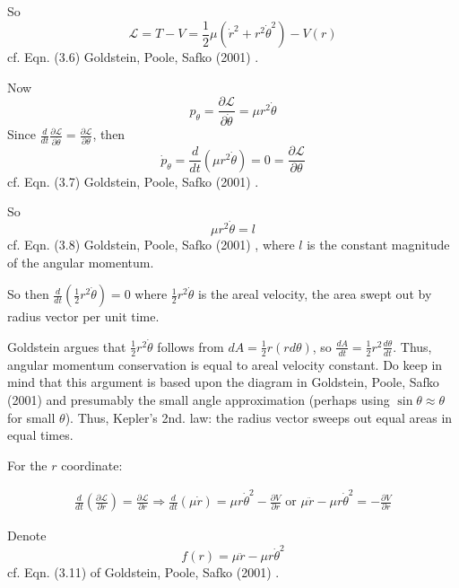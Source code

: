 \documentclass[10pt]{amsart}
\begin{document}
\begin{multicols*}{2}
So 
\begin{equation}
\mathcal{L} = T- V = \frac{1}{2} \mu (\dot{r}^2 + r^2 \dot{\theta}^2 ) - V(r)
\end{equation}
cf. Eqn. (3.6) Goldstein, Poole, Safko (2001) \cite{GPS2001}.

Now
\[
p_{\theta} = \frac{ \partial \mathcal{L} }{ \partial \dot{\theta}} = \mu r^2 \dot{\theta}
\]
Since $\frac{d}{dt} \frac{\partial \mathcal{L}}{ \partial \dot{\theta} } = \frac{\partial \mathcal{L}}{\partial \theta}$, then
\begin{equation}
\dot{p}_{\theta} = \frac{d}{dt} ( \mu r^2 \dot{\theta} ) = 0 = \frac{\partial \mathcal{L}}{\partial \theta}
\end{equation}
cf. Eqn. (3.7)  Goldstein, Poole, Safko (2001) \cite{GPS2001}.

So 
\begin{equation}
\mu r^2 \dot{\theta} = l
\end{equation}
cf. Eqn. (3.8)  Goldstein, Poole, Safko (2001) \cite{GPS2001}, where $l$ is the constant magnitude of the angular momentum.

So then $\frac{d}{dt} \left( \frac{1}{2} r^2 \dot{\theta} \right) = 0$ where $\frac{1}{2} r^2 \dot{\theta}$ is the areal velocity, the area swept out by radius vector per unit time.

Goldstein argues that $\frac{1}{2} r^2 \dot{\theta}$ follows from $dA = \frac{1}{2} r(rd\theta)$, so $\frac{dA}{dt} = \frac{1}{2} r^2 \frac{d\theta}{dt}$. Thus, angular momentum conservation is equal to areal velocity constant. Do keep in mind that this argument is based upon the diagram in  Goldstein, Poole, Safko (2001) \cite{GPS2001} and presumably the small angle approximation (perhaps using $\sin{\theta} \approx \theta$ for small $\theta$). Thus, Kepler's 2nd. law: the radius vector sweeps out equal areas in equal times.

For the $r$ coordinate:

\[
\begin{gathered}
\frac{d}{dt} \left( \frac{ \partial \mathcal{L} }{ \partial \dot{r}} \right) = \frac{\partial \mathcal{L}}{\partial r} \Longrightarrow \frac{d}{dt} ( \mu \dot{r} ) = \mu r\dot{\theta}^2 - \frac{\partial V}{\partial r} \text{ or } \mu \ddot{r} - \mu r \dot{\theta}^2 = -\frac{\partial V}{\partial r}
\end{gathered}
\]

Denote 
\begin{equation}
f(r) = \mu \ddot{r} - \mu r\dot{\theta}^2
\end{equation}
cf. Eqn. (3.11) of  Goldstein, Poole, Safko (2001) \cite{GPS2001}.


\end{multicols*}
\end{document}
